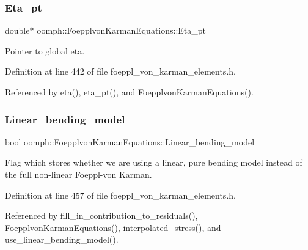 \subsubsection{\texorpdfstring{Eta\+\_\+pt}{Eta\_pt}}
{\footnotesize\ttfamily double$\ast$ oomph\+::\+Foepplvon\+Karman\+Equations\+::\+Eta\+\_\+pt\hspace{0.3cm}{\ttfamily [protected]}}



Pointer to global eta. 



Definition at line 442 of file foeppl\+\_\+von\+\_\+karman\+\_\+elements.\+h.



Referenced by eta(), eta\+\_\+pt(), and Foepplvon\+Karman\+Equations().

\mbox{\label{classoomph_1_1FoepplvonKarmanEquations_a72d0569b3d2ee26df59309e941c6283a}} 
\subsubsection{\texorpdfstring{Linear\+\_\+bending\+\_\+model}{Linear\_bending\_model}}
{\footnotesize\ttfamily bool oomph\+::\+Foepplvon\+Karman\+Equations\+::\+Linear\+\_\+bending\+\_\+model\hspace{0.3cm}{\ttfamily [private]}}



Flag which stores whether we are using a linear, pure bending model instead of the full non-\/linear Foeppl-\/von Karman. 



Definition at line 457 of file foeppl\+\_\+von\+\_\+karman\+\_\+elements.\+h.



Referenced by fill\+\_\+in\+\_\+contribution\+\_\+to\+\_\+residuals(), Foepplvon\+Karman\+Equations(), interpolated\+\_\+stress(), and use\+\_\+linear\+\_\+bending\+\_\+model().

\mbox{\label{classoomph_1_1FoepplvonKarmanEquations_ac1d9616b1faf6b16e1614e12aa07a028}} 
